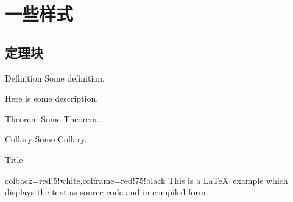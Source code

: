 \section{一些样式}


\subsection{定理块}

\begin{frame}
    \begin{defn}{Definition}{}
    Some definition.
    \end{defn}
    Here is some description.
    \begin{theo}{Theorem}{}
    Some Theorem.
    \end{theo}
    \begin{coro}{Collary}{}
        Some Collary.
    \end{coro}
    
\end{frame}


\begin{frame}
    
\end{frame}


\begin{frame}[fragile]{Title}
    \begin{tcblisting}{colback=red!5!white,colframe=red!75!black}
        This is a \LaTeX\ example which displays the text as source code
        and in compiled form.
    \end{tcblisting}
\end{frame}


